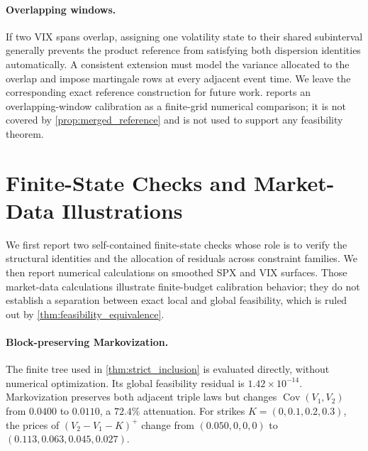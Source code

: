 \documentclass{article}
\DeclareMathOperator{\Cov}{Cov}
\begin{document}
\paragraph{Overlapping windows.}
If two VIX spans overlap, assigning one volatility state to their shared subinterval generally prevents the product reference from satisfying both dispersion identities automatically.
A consistent extension must model the variance allocated to the overlap and impose martingale rows at every adjacent event time.
We leave the corresponding exact reference construction for future work.
 reports an overlapping-window calibration as a finite-grid numerical comparison; it is not covered by \cref{prop:merged_reference} and is not used to support any feasibility theorem.

\section{Finite-State Checks and Market-Data Illustrations}\label{sec:experiments}

We first report two self-contained finite-state checks whose role is to verify the structural identities and the allocation of residuals across constraint families.
We then report numerical calculations on smoothed SPX and VIX surfaces.
Those market-data calculations illustrate finite-budget calibration behavior; they do not establish a separation between exact local and global feasibility, which is ruled out by \cref{thm:feasibility_equivalence}.

\paragraph{Block-preserving Markovization.}
The finite tree used in \cref{thm:strict_inclusion} is evaluated directly, without numerical optimization.
Its global feasibility residual is $1.42\times10^{-14}$.
Markovization preserves both adjacent triple laws but changes $\Cov(V_1,V_2)$ from $0.0400$ to $0.0110$, a $72.4\%$ attenuation.
For strikes $K=(0,0.1,0.2,0.3)$, the prices of $(V_2-V_1-K)^+$ change from $(0.050,0,0,0)$ to $(0.113,0.063,0.045,0.027)$.
\end{document}
